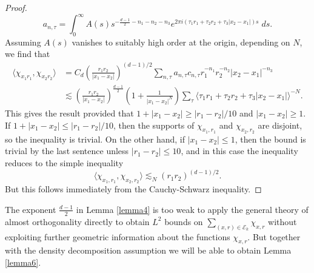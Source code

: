 \begin{proof}
\begin{equation}
      a_{n,\tau} = \int_0^\infty A(s) s^{- \frac{d-1}{2} - n_1 - n_2 - n_3} e^{2 \pi i (\tau_1 r_1 + \tau_2 r_2 + \tau_3 |x_2 - x_1|) s}\; ds.
    \end{equation}
    Assuming $A(s)$ vanishes to suitably high order at the origin, depending on $N$, we find that
    \begin{equation}
    \begin{split}
        \langle \chi_{x_1 r_1}, \chi_{x_2 r_2} \rangle &= C_d \left( \frac{r_1r_2}{|x_1 - x_2|} \right)^{(d-1)/2} \sum\nolimits_{n,\tau} a_{n,\tau} c_{n,\tau} r_1^{-n_1} r_2^{-n_2} |x_2 - x_1|^{-n_3}\\
        &\lesssim \left( \frac{r_1r_2}{|x_1 - x_2|} \right)^{\frac{d-1}{2}} \left(1 + \frac{1}{|x_1 - x_2|^N} \right) \sum\nolimits_{\tau} \langle \tau_1 r_1 + \tau_2 r_2 + \tau_3 |x_2 - x_1| \rangle^{-N}.
    \end{split}
    \end{equation}
    This gives the result provided that $1 + |x_1 - x_2| \geq |r_1 - r_2| / 10$ and $|x_1 - x_2| \geq 1$. If $1 + |x_1 - x_2| \leq |r_1 - r_2| / 10$, then the supports of $\chi_{x_1,r_1}$ and $\chi_{x_2,r_2}$ are disjoint, so the inequality is trivial. On the other hand, if $|x_1 - x_2| \leq 1$, then the bound is trivial by the last sentence unless $|r_1 - r_2| \leq 10$, and in this case the inequality reduces to the simple inequality
    \begin{equation}
      \langle \chi_{x_1,r_1}, \chi_{x_2,r_2} \rangle \lesssim_N (r_1 r_2)^{(d-1)/2}. 
    \end{equation}
    But this follows immediately from the Cauchy-Schwarz inequality.
\end{proof}

The exponent $\tfrac{d-1}{2}$ in Lemma \ref{lemma4} is too weak to apply the general theory of almost orthogonality directly to obtain $L^2$ bounds on $\sum\nolimits_{(x,r) \in \mathcal{E}_k} \chi_{x,r}$ without exploiting further geometric information about the functions $\chi_{x,r}$. But together with the density decomposition assumption we will be able to obtain Lemma \ref{lemma6}.

